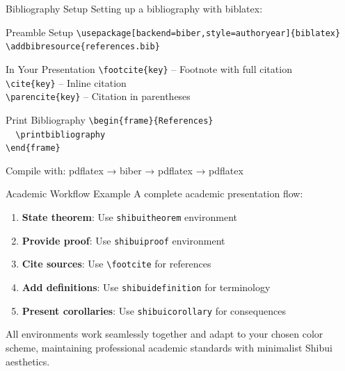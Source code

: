\documentclass[aspectratio=169]{beamer}
\begin{document}
\begin{frame}{Bibliography Setup}
  Setting up a bibliography with biblatex:

  \vspace{0.5em}

  \begin{shibuiframe}{Preamble Setup}
    \texttt{\textbackslash usepackage[backend=biber,style=authoryear]\{biblatex\}} \\
    \texttt{\textbackslash addbibresource\{references.bib\}}
  \end{shibuiframe}

  \vspace{0.5em}

  \begin{shibuiframe}{In Your Presentation}
    \texttt{\textbackslash footcite\{key\}} -- Footnote with full citation \\
    \texttt{\textbackslash cite\{key\}} -- Inline citation \\
    \texttt{\textbackslash parencite\{key\}} -- Citation in parentheses
  \end{shibuiframe}

  \vspace{0.5em}

  \begin{shibuiframe}{Print Bibliography}
    \texttt{\textbackslash begin\{frame\}\{References\}} \\
    \texttt{~~\textbackslash printbibliography} \\
    \texttt{\textbackslash end\{frame\}}
  \end{shibuiframe}

  \vspace{0.5em}

  \small Compile with: pdflatex → biber → pdflatex → pdflatex
\end{frame}

\begin{frame}{Academic Workflow Example}
  A complete academic presentation flow:

  \vspace{0.5em}

  \begin{enumerate}
    \item \textbf{State theorem}: Use \texttt{shibuitheorem} environment
    \item \textbf{Provide proof}: Use \texttt{shibuiproof} environment
    \item \textbf{Cite sources}: Use \texttt{\textbackslash footcite} for references
    \item \textbf{Add definitions}: Use \texttt{shibuidefinition} for terminology
    \item \textbf{Present corollaries}: Use \texttt{shibuicorollary} for consequences
  \end{enumerate}

  \vspace{1em}

  All environments work seamlessly together and adapt to your chosen color scheme, maintaining professional academic standards with minimalist Shibui aesthetics.
\end{frame}
\end{document}
